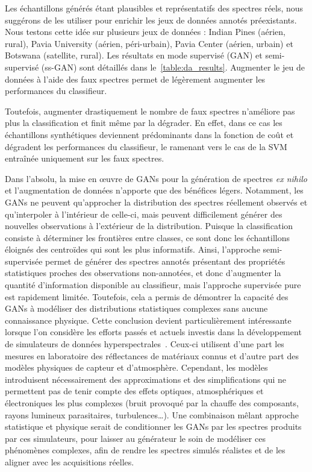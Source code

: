 Les échantillons générés étant plausibles et représentatifs des spectres réels, nous suggérons de les utiliser pour enrichir les jeux de données annotés préexistants. Nous testons cette idée sur plusieurs jeux de données : Indian Pines (aérien, rural), Pavia University (aérien, péri-urbain), Pavia Center (aérien, urbain) et Botswana (satellite, rural). Les résultats en mode supervisé (\gls{GAN}) et semi-supervisé (ss-\gls{GAN}) sont détaillés dans le~\cref{table:da_results}. Augmenter le jeu de données à l'aide des faux spectres permet de légèrement augmenter les performances du classifieur.

Toutefois, augmenter drastiquement le nombre de faux spectres n'améliore pas plus la classification et finit même par la dégrader. En effet, dans ce cas les échantillons synthétiques deviennent prédominants dans la fonction de coût et dégradent les performances du classifieur, le ramenant vers le cas de la \gls{SVM} entraînée uniquement sur les faux spectres.

Dans l'absolu, la mise en \oe{}uvre de \glspl{GAN} pour la génération de spectres \emph{ex nihilo} et l'augmentation de données n'apporte que des bénéfices légers. Notamment, les \glspl{GAN} ne peuvent qu'approcher la distribution des spectres réellement observés et qu'interpoler à l'intérieur de celle-ci, mais peuvent difficilement générer des nouvelles observations à l'extérieur de la distribution. Puisque la classification consiste à déterminer les frontières entre classes, ce sont donc les échantillons éloignés des centroïdes qui sont les plus informatifs. Ainsi, l'approche semi-supervisée permet de générer des spectres annotés présentant des propriétés statistiques proches des observations non-annotées, et donc d'augmenter la quantité d'information disponible au classifieur, mais l'approche supervisée pure est rapidement limitée. Toutefois, cela a permis de démontrer la capacité des \glspl{GAN} à modéliser des distributions statistiques complexes sans aucune connaissance physique. Cette conclusion devient particulièrement intéressante lorsque l'on considère les efforts passés et actuels investis dans la développement de simulateurs de données hyperspectrales~\cite{borner_sensor_2001}. Ceux-ci utilisent d'une part les mesures en laboratoire des réflectances de matériaux connus et d'autre part des modèles physiques de capteur et d'atmosphère. Cependant, les modèles introduisent nécessairement des approximations et des simplifications qui ne permettent pas de tenir compte des effets optiques, atmosphériques et électroniques les plus complexes (bruit provoqué par la chauffe des composants, rayons lumineux parasitaires, turbulences\dots). Une combinaison mêlant approche statistique et physique serait de conditionner les \glspl{GAN} par les spectres produits par ces simulateurs, pour laisser au générateur le soin de modéliser ces phénomènes complexes, afin de rendre les spectres simulés réalistes et de les aligner avec les acquisitions réelles.

